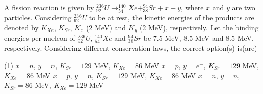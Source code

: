 
\item A fission reaction is given by \(_{92}^{236}U \rightarrow _{54}^{140}Xe + _{38}^{94}Sr + x + y\), where \(x\) and \(y\) are two particles. Considering \(_{92}^{236}U\) to be at rest, the kinetic energies of the products are denoted by \(K_{Xe}\), \(K_{Sr}\), \(K_x\) (2 MeV) and \(K_y\) (2 MeV), respectively. Let the binding energies per nucleon of \(_{92}^{236}U\), \(_{54}^{140}Xe\) and \(_{38}^{94}Sr\) be 7.5 MeV, 8.5 MeV and 8.5 MeV, respectively. Considering different conservation laws, the correct option(s) is(are)
        \begin{tasks}(1)
            \task \(x = n\), \(y = n\), \(K_{Sr} = 129\) MeV, \(K_{Xe} = 86\) MeV
            \task \(x = p\), \(y = e^{-}\), \(K_{Sr} = 129\) MeV, \(K_{Xe} = 86\) MeV
            \task \(x = p\), \(y = n\), \(K_{Sr} = 129\) MeV, \(K_{Xe} = 86\) MeV
            \task \(x = n\), \(y = n\), \(K_{Sr} = 86\) MeV, \(K_{Xe} = 129\) MeV
        \end{tasks}
